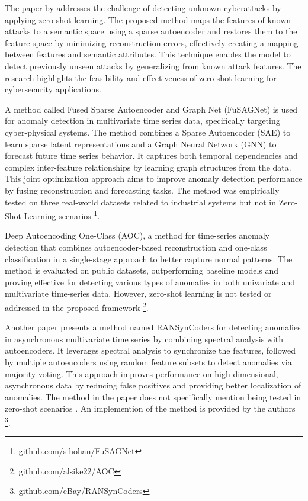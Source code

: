 The paper by \cite{zhang_unknown_2020} addresses the challenge of detecting unknown cyberattacks by applying zero-shot learning. The proposed method maps the features of known attacks to a semantic space using a sparse autoencoder and restores them to the feature space by minimizing reconstruction errors, effectively creating a mapping between features and semantic attributes. This technique enables the model to detect previously unseen attacks by generalizing from known attack features. The research highlights the feasibility and effectiveness of zero-shot learning for cybersecurity applications.

A method called Fused Sparse Autoencoder and Graph Net (FuSAGNet) is used for anomaly detection in multivariate time series data, specifically targeting cyber-physical systems. The method combines a Sparse Autoencoder (SAE) to learn sparse latent representations and a Graph Neural Network (GNN) to forecast future time series behavior. It captures both temporal dependencies and complex inter-feature relationships by learning graph structures from the data. This joint optimization approach aims to improve anomaly detection performance by fusing reconstruction and forecasting tasks. The method was empirically tested on three real-world datasets related to industrial systems but not in Zero-Shot Learning scenarios \cite{han_learning_2022} \footnote{\fussy\tiny github.com/sihohan/FuSAGNet}.

Deep Autoencoding One-Class (AOC), a method for time-series anomaly detection that combines autoencoder-based reconstruction and one-class classification in a single-stage approach to better capture normal patterns. The method is evaluated on public datasets, outperforming baseline models and proving effective for detecting various types of anomalies in both univariate and multivariate time-series data. However, zero-shot learning is not tested or addressed in the proposed framework \cite{mou_deep_2023} \footnote{\fussy\tiny github.com/alsike22/AOC}.

Another paper presents a method named RANSynCoders for detecting anomalies in asynchronous multivariate time series by combining spectral analysis with autoencoders. It leverages spectral analysis to synchronize the features, followed by multiple autoencoders using random feature subsets to detect anomalies via majority voting. This approach improves performance on high-dimensional, asynchronous data by reducing false positives and providing better localization of anomalies. The method in the paper does not specifically mention being tested in zero-shot scenarios \cite{abdulaal_practical_2021}. An implemention of the method is provided by the authors \footnote{\fussy\tiny github.com/eBay/RANSynCoders}.

